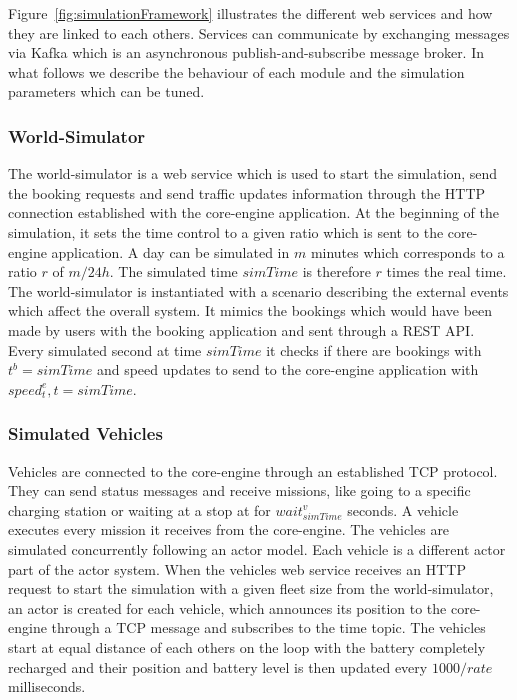 \documentclass[12pt,a4paper]{article}
\begin{document}
Figure~\ref{fig:simulationFramework} illustrates the different web services and how they are linked to each others. Services can communicate by exchanging messages via Kafka which is an asynchronous publish-and-subscribe message broker. In what follows we describe the behaviour of each module and the simulation parameters which can be tuned. 

\subsubsection{World-Simulator}
The world-simulator is a web service which is used to start the simulation, send the booking requests and send traffic updates information through the HTTP connection established with the core-engine application. At the beginning of the simulation, it sets the time control to a given ratio which is sent to the core-engine application. A day can be simulated in $m$ minutes which corresponds to a ratio $r$ of $m / 24h$. The simulated time $simTime$ is therefore $r$ times the real time. The world-simulator is instantiated with a scenario describing the external events which affect the overall system. It mimics the bookings which would have been made by users with the booking application and sent through a REST API. Every simulated second at time $simTime$ it checks if there are bookings with $t^{b} = simTime$ and speed updates to send to the core-engine application with $speed_{t}^{e}, t = simTime$. 

\subsubsection{Simulated Vehicles}\label{simvehicles}
Vehicles are connected to the core-engine through an established TCP protocol. They can send status messages and receive missions, like going to a specific charging station or waiting at a stop at for $wait^{v}_{simTime}$ seconds. A vehicle executes every mission it receives from the core-engine. The vehicles are simulated concurrently following an actor model. Each vehicle is a different actor part of the actor system. When the vehicles web service receives an HTTP request to start the simulation with a given fleet size from the world-simulator, an actor is created for each vehicle, which announces its position to the core-engine through a TCP message and subscribes to the time topic. The vehicles start at equal distance of each others on the loop with the battery completely recharged and their position and battery level is then updated every $1000/rate$ milliseconds.  
\end{document}
